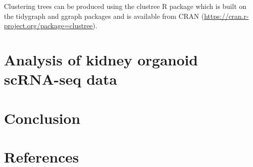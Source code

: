 \documentclass[11pt,a4paper,titlepage,twoside,openright]{style/unimelbthesis}
\theoremstyle{definition}
\theoremstyle{definition}
\theoremstyle{definition}
\theoremstyle{remark}
\begin{document}
\begin{mainmatter}
Clustering trees can be produced using the clustree R package which is built on the tidygraph and ggraph packages and is available from CRAN (\url{https://cran.r-project.org/package=clustree}).

\hypertarget{analysis-of-kidney-organoid-scrna-seq-data}{%
\chapter{Analysis of kidney organoid scRNA-seq data}\label{analysis-of-kidney-organoid-scrna-seq-data}}

\hypertarget{conclusion}{%
\chapter{Conclusion}\label{conclusion}}

\hypertarget{references}{%
\chapter*{References}\label{references}}

\hypertarget{refs}{}

\end{mainmatter}
\end{document}
